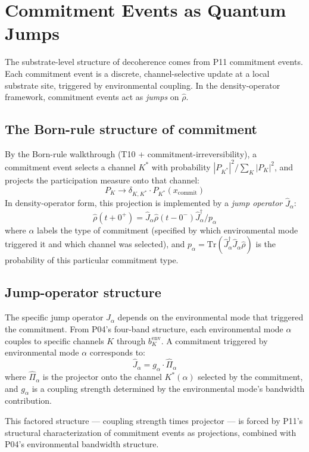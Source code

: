 \documentclass[11pt,a4paper]{article}
\begin{document}
\section{Commitment Events as Quantum Jumps}

The substrate-level structure of decoherence comes from P11 commitment events. Each commitment event is a discrete, channel-selective update at a local substrate site, triggered by environmental coupling. In the density-operator framework, commitment events act as \emph{jumps} on $\hat\rho$.

\subsection{The Born-rule structure of commitment}

By the Born-rule walkthrough (T10 + commitment-irreversibility), a commitment event selects a channel $K^*$ with probability $|P_{K^*}|^2 / \sum_K |P_K|^2$, and projects the participation measure onto that channel:
\[
P_K \to \delta_{K, K^*} \cdot P_{K^*}(x_{\mathrm{commit}})
\]
In density-operator form, this projection is implemented by a \emph{jump operator} $\hat J_\alpha$:
\[
\hat\rho(t + 0^{+}) = \hat J_\alpha \hat\rho(t - 0^{-}) \hat J_\alpha^\dagger / p_\alpha
\]
where $\alpha$ labels the type of commitment (specified by which environmental mode triggered it and which channel was selected), and $p_\alpha = \mathrm{Tr}(\hat J_\alpha^\dagger \hat J_\alpha \hat\rho)$ is the probability of this particular commitment type.

\subsection{Jump-operator structure}

The specific jump operator $\hat J_\alpha$ depends on the environmental mode that triggered the commitment. From P04's four-band structure, each environmental mode $\alpha$ couples to specific channels $K$ through $b_K^{\mathrm{env}}$. A commitment triggered by environmental mode $\alpha$ corresponds to:
\[
\hat J_\alpha = g_\alpha\cdot\hat\Pi_\alpha
\]
where $\hat\Pi_\alpha$ is the projector onto the channel $K^*(\alpha)$ selected by the commitment, and $g_\alpha$ is a coupling strength determined by the environmental mode's bandwidth contribution.

This factored structure --- coupling strength times projector --- is forced by P11's structural characterization of commitment events as projections, combined with P04's environmental bandwidth structure.
\end{document}
